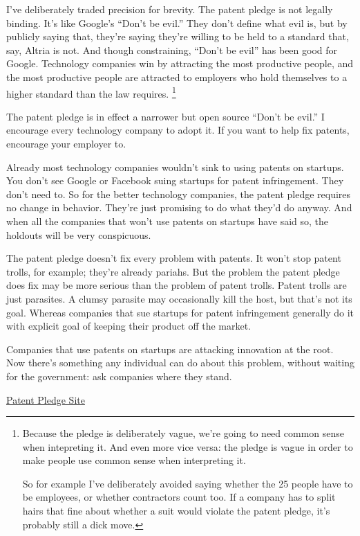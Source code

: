 I've deliberately traded precision for brevity. The patent pledge is not
legally binding. It's like Google's ``Don't be evil.'' They don't define
what evil is, but by publicly saying that, they're saying they're
willing to be held to a standard that, say, Altria is not. And though
constraining, ``Don't be evil'' has been good for Google. Technology
companies win by attracting the most productive people, and the most
productive people are attracted to employers who hold themselves to a
higher standard than the law requires. \footnote{Because the pledge is deliberately vague, we're going to need
common sense when intepreting it. And even more vice versa: the pledge
is vague in order to make people use common sense when interpreting it.

So for example I've deliberately avoided saying whether the 25 people
have to be employees, or whether contractors count too. If a company has
to split hairs that fine about whether a suit would violate the patent
pledge, it's probably still a dick move.}

The patent pledge is in effect a narrower but open source ``Don't be
evil.'' I encourage every technology company to adopt it. If you want to
help fix patents, encourage your employer to.

Already most technology companies wouldn't sink to using patents on
startups. You don't see Google or Facebook suing startups for patent
infringement. They don't need to. So for the better technology
companies, the patent pledge requires no change in behavior. They're
just promising to do what they'd do anyway. And when all the companies
that won't use patents on startups have said so, the holdouts will be
very conspicuous.

The patent pledge doesn't fix every problem with patents. It won't stop
patent trolls, for example; they're already pariahs. But the problem the
patent pledge does fix may be more serious than the problem of patent
trolls. Patent trolls are just parasites. A clumsy parasite may
occasionally kill the host, but that's not its goal. Whereas companies
that sue startups for patent infringement generally do it with explicit
goal of keeping their product off the market.

Companies that use patents on startups are attacking innovation at the
root. Now there's something any individual can do about this problem,
without waiting for the government: ask companies where they stand.

\href{http://thepatentpledge.org}{Patent Pledge Site}